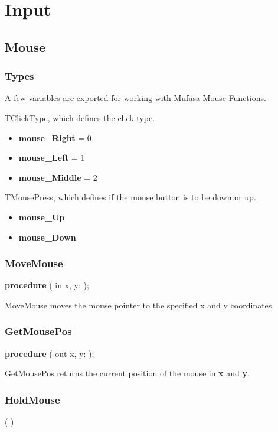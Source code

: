 \documentclass[a4paper]{report}
\begin{document}
\chapter{Input}

\section{Mouse}

\subsection{Types}

A few variables are exported for working with Mufasa Mouse Functions.

TClickType, which defines the click type.
\begin{itemize}
	\item \textbf{mouse\_Right} = 0
	\item \textbf{mouse\_Left} = 1
	\item \textbf{mouse\_Middle} = 2
\end{itemize}

TMousePress, which defines if the mouse button is to be down or up.
\begin{itemize}
	\item \textbf{mouse\_Up}
	\item \textbf{mouse\_Down}
\end{itemize}


\subsection{MoveMouse}
\textbf{procedure} {\color{blue}{MoveMouse}}({\color{typeRed}
{in x, y: }}{\color{typeGreen}{Integer}});

MoveMouse moves the mouse pointer to the specified x and y coordinates.

\subsection{GetMousePos}
\textbf{procedure} {\color{blue}{GetMousePos}}({\color{typeRed}
{out x, y: }}{\color{typeGreen}{Integer}});

GetMousePos returns the current position of the mouse in \textbf{x} and
\textbf{y}.

\subsection{HoldMouse}
\pproc {}(  
)
\end{document}
